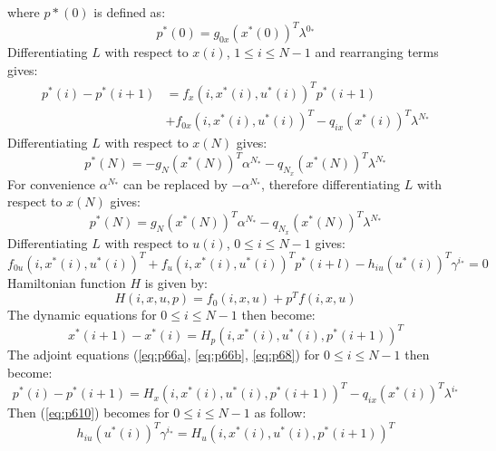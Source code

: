 \noindent where $p*(0)$ is defined as:
\begin{equation}\label{eq:p67}
    p^*(0) = g_{0x}(x^*(0))^T \lambda^{0_*}
\end{equation}
\noindent Differentiating $L$ with respect to $x(i)$, $1\le i \le N-1$ and rearranging terms gives:
\begin{equation}
    \begin{split}\label{eq:p68}
    p^*(i) - p^*(i+1) &= f_x(i,x^*(i),u^*(i))^T p^*(i+1)\\
    & + f_{0x}(i,x^*(i),u^*(i))^T - q_{ix}(x^*(i))^T \lambda^{N_*}
    \end{split}
\end{equation}
\noindent Differentiating $L$ with respect to $x(N)$ gives:
\begin{equation}\label{eq:p69}
    p^*(N) = -g_N(x^*(N))^T \alpha^{N_*} - q_{N_x}(x^*(N))^T \lambda^{N_*}
\end{equation}
\noindent For convenience $\alpha^{N_*}$ can be replaced by $-\alpha^{N_*}$, therefore differentiating $L$ with respect to $x(N)$ gives:
\begin{equation}
    p^*(N) = g_N(x^*(N))^T \alpha^{N_*} - q_{N_x}(x^*(N))^T \lambda^{N_*}
\end{equation}
\noindent Differentiating $L$ with respect to $u(i)$, $0\le i \le N-1$ gives:
\begin{equation}\label{eq:p610}
    f_{0u}(i,x^*(i),u^*(i))^T + f_u(i,x^*(i),u^*(i))^T p^*(i+l)- h_{iu}(u^*(i))^T \gamma^{i_*} = 0
\end{equation}
\noindent Hamiltonian function $H$ is given by:
\begin{equation}
    H(i,x,u,p) = f_0(i,x,u) + p^T f(i,x,u)
\end{equation}
\noindent The dynamic equations for $0 \le i \le N-1$ then become:
\begin{equation}
    x^*(i+1) - x^*(i) = H_p(i,x^*(i),u^*(i),p^*(i+1))^T
\end{equation}
\noindent The adjoint equations (\ref{eq:p66a}, \ref{eq:p66b}, \ref{eq:p68}) for $0 \le i \le N-1$ then become:
\begin{equation}
    p^*(i) - p^*(i+1) = H_x(i,x^*(i),u^*(i),p^*(i+1))^T - q_{ix}(x^*(i))^T \lambda^{i_*}
\end{equation}
\noindent Then (\ref{eq:p610}) becomes for $0 \le i \le N-1$ as follow:
\begin{equation}
    h_{iu}(u^*(i))^T \gamma^{i_*} = H_{u}(i,x^*(i),u^*(i),p^*(i+1))^T
\end{equation}
